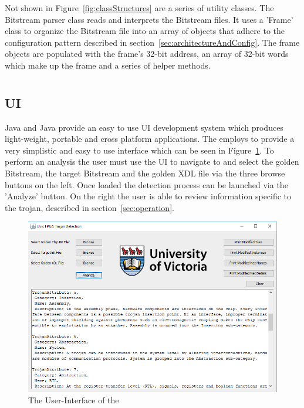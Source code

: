 Not shown in Figure~\ref{fig:classStructures} are a series of utility classes.
The \gls{Bitstream} parser class reads and interprets the \gls{Bitstream} files. 
It uses a 'Frame' class to organize the \gls{Bitstream} file into an array of objects that adhere to the configuration pattern described in section~\ref{sec:architectureAndConfig}.
The frame objects are populated with the frame's 32-bit address, an array of 32-bit words which make up the frame and a series of helper methods.
\section{\Name}
\subsection{\acrfull{UI}}
Java and Java \Swing provide an easy to use \acrlong{UI} development system which produces light-weight, portable and cross platform applications.
The \NameNoPeriod employs \Swing to provide a very simplistic and easy to use interface which can be seen in Figure~\ref{fig:UI}.
To perform an analysis the user must use the \acrshort{UI} to navigate to and select the \gls{golden} \gls{Bitstream}, the \gls{target} \gls{Bitstream} and the \gls{golden} \acrshort{XDL} file via the three browse buttons on the left.
Once loaded the detection process can be launched via the 'Analyze' button.
On the right the user is able to review information specific to the trojan, described in section~\ref{sec:operation}.
\begin{figure}
\centering
\includegraphics[width=0.96\linewidth]{Figures/UI}
\caption[The User-Interface of the \NameNoPeriod]{The User-Interface of the \NameNoPeriod}
\label{fig:UI}
\end{figure}
